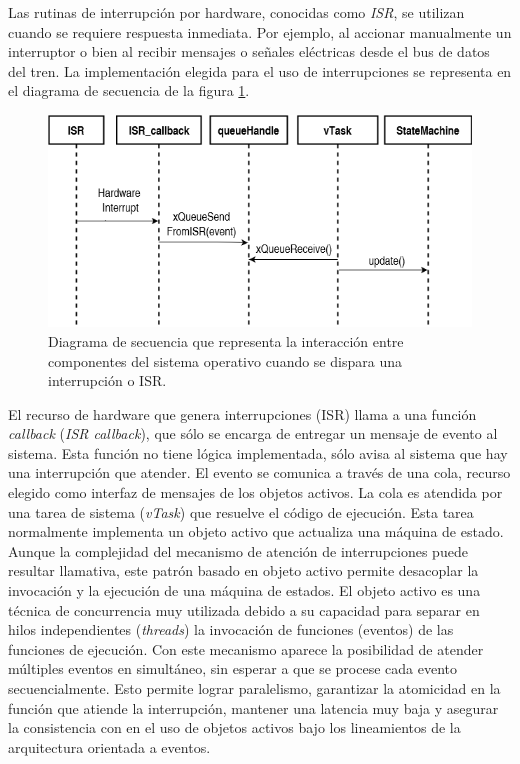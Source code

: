 Las rutinas de interrupción por hardware, conocidas como \textit{ISR}, se utilizan cuando se requiere respuesta inmediata. Por ejemplo, al accionar manualmente un interruptor o bien al recibir mensajes o señales eléctricas desde el bus de datos del tren. La implementación elegida para el uso de interrupciones se representa en el diagrama de secuencia de la figura \ref{fig:ISR}. \\

\begin{figure}[ht]
	\centering
	\includegraphics[width=1\textwidth]{./Figures/ISRcallback.png}
	\caption{Diagrama de secuencia que representa la interacción entre componentes del sistema operativo cuando se dispara una interrupción o ISR.}
	\label{fig:ISR}
\end{figure}

El recurso de hardware que genera interrupciones (ISR) llama a una función \textit{callback} (\textit{ISR callback}), que sólo se encarga de entregar un mensaje de evento al sistema. Esta función no tiene lógica implementada, sólo avisa al sistema que hay una interrupción que atender. El evento se comunica a través de una cola, recurso elegido como interfaz de mensajes de los objetos activos. La cola es atendida por una tarea de sistema (\textit{vTask}) que resuelve el código de ejecución. Esta tarea normalmente implementa un objeto activo que actualiza una máquina de estado.\\

Aunque la complejidad del mecanismo de atención de interrupciones puede resultar llamativa, este patrón basado en objeto activo permite desacoplar la invocación y la ejecución de una máquina de estados. El objeto activo es una técnica de concurrencia muy utilizada debido a su capacidad para separar en hilos independientes (\textit{threads}) la invocación de funciones (eventos) de las funciones de ejecución. Con este mecanismo aparece la posibilidad de atender múltiples eventos en simultáneo, sin esperar a que se procese cada evento secuencialmente. Esto permite lograr paralelismo, garantizar la atomicidad en la función que atiende la interrupción, mantener una latencia muy baja y asegurar la consistencia con en el uso de objetos activos bajo los lineamientos de la arquitectura orientada a eventos.\\


